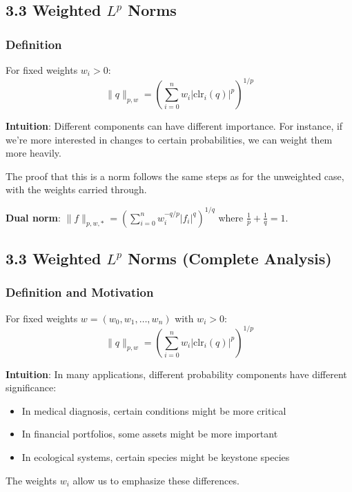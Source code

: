 \documentclass{amsart}
\theoremstyle{plain}
\theoremstyle{definition}
\theoremstyle{remark}
\begin{document}
\subsection{3.3 Weighted \texorpdfstring{$L^p$}{L^p} Norms}

\subsubsection{Definition}

For fixed weights $w_i > 0$:
\[
\|q\|_{p,w} = \left( \sum_{i=0}^n w_i |\text{clr}_i(q)|^p \right)^{1/p}
\]

\textbf{Intuition}: Different components can have different importance. For instance, if we're more interested in changes to certain probabilities, we can weight them more heavily.

The proof that this is a norm follows the same steps as for the unweighted case, with the weights carried through.

\textbf{Dual norm}: $\|f\|_{p,w,*} = \left( \sum_{i=0}^n w_i^{-q/p} |f_i|^q \right)^{1/q}$ where $\frac{1}{p} + \frac{1}{q} = 1$.

\subsection{3.3 Weighted \texorpdfstring{$L^p$}{L^p} Norms (Complete Analysis)}

\subsubsection{Definition and Motivation}

For fixed weights $w = (w_0, w_1, \ldots, w_n)$ with $w_i > 0$:
\[
\|q\|_{p,w} = \left( \sum_{i=0}^n w_i |\text{clr}_i(q)|^p \right)^{1/p}
\]

\textbf{Intuition}: In many applications, different probability components have different significance:

\begin{itemize}
	\item In medical diagnosis, certain conditions might be more critical
	\item In financial portfolios, some assets might be more important
	\item In ecological systems, certain species might be keystone species
\end{itemize}

The weights $w_i$ allow us to emphasize these differences.
\end{document}

